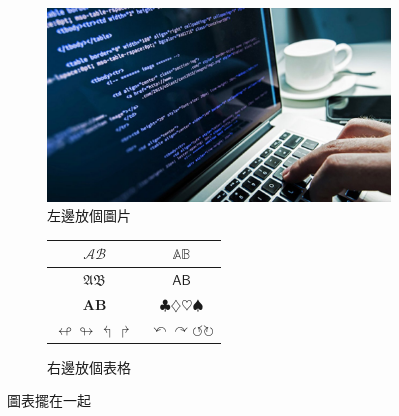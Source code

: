 \begin{figure}[hbpt]
    \centering
    \begin{subfigure}{0.4\linewidth}
        \includegraphics[width=\textwidth]{Figures/computer_science.jpg}
        \caption{左邊放個圖片}
    \end{subfigure}
    \hfill
    \begin{subfigure}{0.48\linewidth}
        \centering
        \begin{tabular}{c | c }
            $\mathcal{A} \mathcal{B}  $                   & $\mathbb{A} \mathbb{B}  $                                               \\
            \hline \hline
            $\mathfrak{A} \mathfrak{B}  $                 & $\mathsf{A} \mathsf{B}  $                                               \\
            $\mathbf{A} \mathbf{B}  $                     & $\clubsuit \diamondsuit \heartsuit \spadesuit  $                        \\
            $ \looparrowleft \looparrowright \Lsh \Rsh  $ & $\curvearrowleft \curvearrowright \circlearrowleft \circlearrowright  $ \\
        \end{tabular}
        \caption{右邊放個表格}
    \end{subfigure}
    \caption{圖表擺在一起}
    \label{fig:figexample3}
\end{figure}